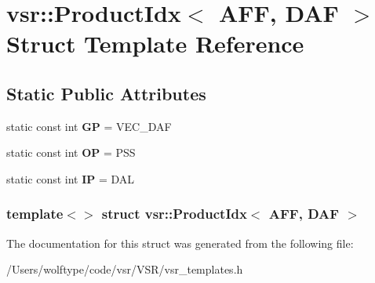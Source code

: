 \hypertarget{structvsr_1_1_product_idx_3_01_a_f_f_00_01_d_a_f_01_4}{\section{vsr\-:\-:Product\-Idx$<$ A\-F\-F, D\-A\-F $>$ Struct Template Reference}
\label{structvsr_1_1_product_idx_3_01_a_f_f_00_01_d_a_f_01_4}
}
\subsection*{Static Public Attributes}
\begin{DoxyCompactItemize}
\item 
\hypertarget{structvsr_1_1_product_idx_3_01_a_f_f_00_01_d_a_f_01_4_a775d6bf23f864a85746bd2fc8b731567}{static const int {\bfseries G\-P} = V\-E\-C\-\_\-\-D\-A\-F}\label{structvsr_1_1_product_idx_3_01_a_f_f_00_01_d_a_f_01_4_a775d6bf23f864a85746bd2fc8b731567}

\item 
\hypertarget{structvsr_1_1_product_idx_3_01_a_f_f_00_01_d_a_f_01_4_aa9446ea2d4a948a9d647d2cfeed19e8a}{static const int {\bfseries O\-P} = P\-S\-S}\label{structvsr_1_1_product_idx_3_01_a_f_f_00_01_d_a_f_01_4_aa9446ea2d4a948a9d647d2cfeed19e8a}

\item 
\hypertarget{structvsr_1_1_product_idx_3_01_a_f_f_00_01_d_a_f_01_4_a1aafa0ff1bd3a02d4aada4c5dcd54ee9}{static const int {\bfseries I\-P} = D\-A\-L}\label{structvsr_1_1_product_idx_3_01_a_f_f_00_01_d_a_f_01_4_a1aafa0ff1bd3a02d4aada4c5dcd54ee9}

\end{DoxyCompactItemize}
\subsubsection*{template$<$$>$ struct vsr\-::\-Product\-Idx$<$ A\-F\-F, D\-A\-F $>$}



The documentation for this struct was generated from the following file\-:\begin{DoxyCompactItemize}
\item 
/\-Users/wolftype/code/vsr/\-V\-S\-R/vsr\-\_\-templates.\-h\end{DoxyCompactItemize}
